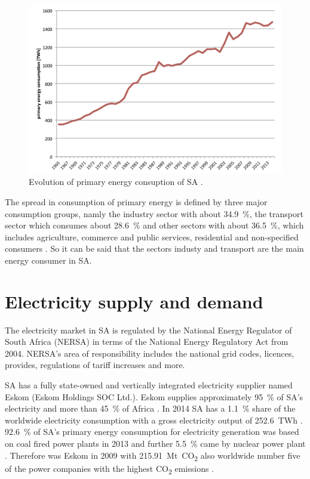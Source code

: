 \begin{figure}[htbp]  
\centering
\includegraphics[width=1\linewidth]{FIG/PrimEnergyDevelopment}
\caption[Evolution of primary energy consuption of SA.]{Evolution of primary energy consuption of SA \cite{BP2015c}.}\label{PrimEnergyDevelopment}
\end{figure}
The spread in consumption of primary energy is defined by three major consumption groups, namly the industry sector with about 34.9~\%, the transport sector which consumes about 28.6~\% and other sectors with about 36.5~\%, which includes agriculture, commerce and public services, residential and non-specified consumers \cite{DepartmentofEnergy2012}. So it can be said that the sectors industy and transport are the main energy consumer in SA. 
\pagebreak
\section{Electricity supply and demand}
The electricity market in SA is regulated by the National Energy Regulator of South Africa (NERSA) in terms of the National Energy Regulatory Act from 2004. NERSA's area of responsibility includes the national grid codes, licences, provides, regulations of tariff increases and more. \cite{Eskom2015a}

SA has a fully state-owned and vertically integrated electricity supplier named Eskom (Eskom Holdings SOC Ltd.). Eskom supplies approximately 95~\% of SA's electricity and more than 45~\% of Africa \cite{EskomGenerationDivision2014}. In 2014 SA has a 1.1~\% share of the worldwide electricity consumption with a gross electricity output of 252.6~TWh \cite{BP2015c}. 92.6~\% of SA's primary energy consumption for electricity generation was based on coal fired power plants in 2013 and further 5.5~\% came by nuclear power plant \cite{Agency2015}. Therefore was Eskom in 2009 with 215.91~Mt~CO\textsubscript{2} also worldwide number five of the power companies with the highest CO\textsubscript{2} emissions \cite{CARMA2015}.

